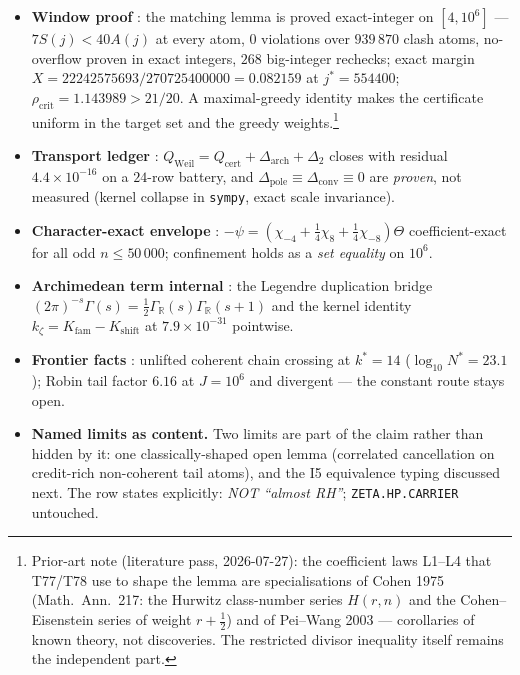 \documentclass[11pt,a4paper]{article}
\newcommand{\R}{\mathbb R}
\newcommand{\Qcert}{Q_{\mathrm{cert}}}
\newcommand{\Darch}{\Delta_{\mathrm{arch}}}
\newcommand{\Qweil}{Q_{\mathrm{Weil}}}
\begin{document}
\begin{itemize}[leftmargin=1.5em]
\item \textbf{Window proof} \mE: the matching lemma is proved exact-integer on $[4,10^6]$ ---
$7S(j)<40A(j)$ at every atom, $0$ violations over $939\,870$ clash atoms, no-overflow proven in exact
integers, $268$ big-integer rechecks; exact margin $X=22242575693/270725400000=0.082159$ at
$j^*=554400$; $\rho_{\mathrm{crit}}=1.143989>21/20$. A maximal-greedy identity makes the certificate
uniform in the target set and the greedy weights.\footnote{Prior-art note (literature pass,
2026-07-27): the coefficient laws L1--L4 that T77/T78 use to shape the lemma are specialisations of
Cohen 1975 (Math.\ Ann.\ 217: the Hurwitz class-number series $H(r,n)$ and the Cohen--Eisenstein
series of weight $r+\frac12$) and of Pei--Wang 2003 --- corollaries of known theory, not discoveries.
The restricted divisor inequality itself remains the independent part.}
\item \textbf{Transport ledger} \mE: $\Qweil=\Qcert+\Darch+\Delta_2$ closes with residual
$4.4\times10^{-16}$ on a $24$-row battery, and $\Delta_{\mathrm{pole}}\equiv\Delta_{\mathrm{conv}}\equiv0$
are \emph{proven}, not measured (kernel collapse in \texttt{sympy}, exact scale invariance).
\item \textbf{Character-exact envelope} \mE: $-\psi=(\chi_{-4}+\tfrac14\chi_8+\tfrac14\chi_{-8})\Theta$
coefficient-exact for all odd $n\le50\,000$; confinement holds as a \emph{set equality} on $10^6$.
\item \textbf{Archimedean term internal} \mE: the Legendre duplication bridge
$(2\pi)^{-s}\Gamma(s)=\tfrac12\Gamma_\R(s)\Gamma_\R(s{+}1)$ and the kernel identity
$k_\zeta=K_{\mathrm{fam}}-K_{\mathrm{shift}}$ at $7.9\times10^{-31}$ pointwise.
\item \textbf{Frontier facts} \mC: unlifted coherent chain crossing at $k^*=14$
($\log_{10}N^*=23.1$); Robin tail factor $6.16$ at $J=10^6$ and divergent --- the constant route stays
open.
\item \textbf{Named limits as content.} Two limits are part of the claim rather than hidden by it:
one classically-shaped open lemma (correlated cancellation on credit-rich non-coherent tail atoms), and
the I5 equivalence typing discussed next. The row states explicitly: \emph{NOT ``almost RH''};
\texttt{ZETA.HP.CARRIER} untouched.
\end{itemize}
\end{document}
